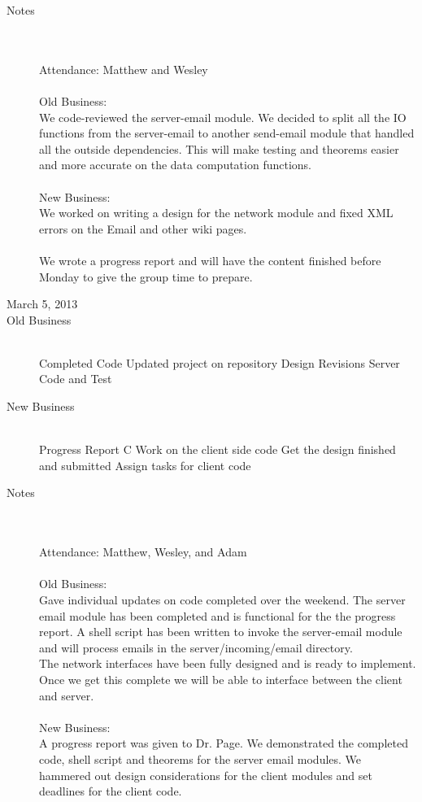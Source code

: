 \documentclass[11pt, letterpaper]{report}
\begin{document}
\begin{description}
\item[Notes] \hfill \\ \hfill \\
Attendance:  Matthew and Wesley\\ \\
Old Business: \\
We code-reviewed the server-email module. We decided to split all the IO functions from the server-email to another send-email module that handled all the outside dependencies. This will make testing and theorems easier and more accurate on the data computation functions. 
\\ \\
New Business: \\
We worked on writing a design for the network module and fixed XML errors on the Email and other wiki pages. \\ \\
We wrote a progress report and will have the content finished before Monday to give the group time to prepare.




\newpage
\item[\Large March 5, 2013]
\hypertarget{March 5, 2013} {}
\item[Old Business] \hfill \\
\subitem Completed Code
\subitem Updated project on repository
\subitem Design Revisions
\subitem Server Code and Test
\item[New Business] \hfill \\
\subitem Progress Report C
\subitem Work on the client side code
\subsubitem Get the design finished and submitted
\subsubitem Assign tasks for client code

\item[Notes] \hfill \\ \hfill \\
Attendance:  Matthew, Wesley, and Adam\\ \\
Old Business: \\
Gave individual updates on code completed over the weekend. The server email module has been completed and is functional for the the progress report. A shell script has been written to invoke the server-email module and will process emails in the server/incoming/email directory.\\
The network interfaces have been fully designed and is ready to implement. Once we get this complete we will be able to interface between the client and server.
\\ \\
New Business: \\
A progress report was given to Dr. Page. We demonstrated the completed code, shell script and theorems for the server email modules. We hammered out design considerations for the client modules and set deadlines for the client code. 




\end{description}
\end{document}
